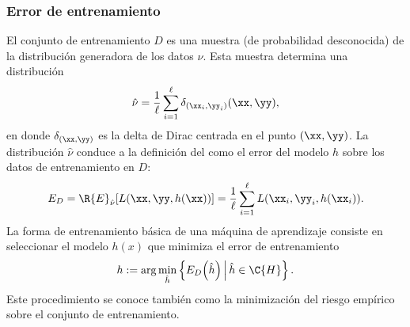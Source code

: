 %
\subsubsection{Error de entrenamiento}
%
El conjunto de entrenamiento $D$ es una muestra (de probabilidad
desconocida) de la distribución generadora de los datos $\nu$.
Esta muestra determina una distribución 
%
\begin{align}
  \hat{\nu}=\frac{1}{\ell}\sum_{i=1}^{\ell}\delta_{(\xx_i,\yy_i)}(\xx,\yy),
\end{align}
%
en donde $\delta_{(\xx,\yy)}$ es la delta de Dirac centrada en el
punto $(\xx,\yy)$.
La distribución $\hat{\nu}$ conduce a la definición del
 como el error del modelo $h$ sobre los
datos de entrenamiento en $D$:
%
\begin{align}
  E_D=\R{E}_{\hat{\nu}}[L(\xx,\yy,h(\xx))]
  =\frac{1}{\ell}\sum_{i=1}^\ell L(\xx_i, \yy_i, h(\xx_i)).
\end{align}
%
La forma de entrenamiento básica de una máquina de aprendizaje
consiste en seleccionar el modelo $h(x)$ que minimiza el error de
entrenamiento
%
\begin{align}
  {h}:=\arg \min_{\hat{h}} \left\{
  E_D\!\left(\hat{h}\right)\,\middle|\,\hat{h} \in \C{H}\right\}.
  \label{e2:minerrorempirico}
\end{align}
%
Este procedimiento se conoce también como la minimización del riesgo
empírico sobre el conjunto de entrenamiento.
